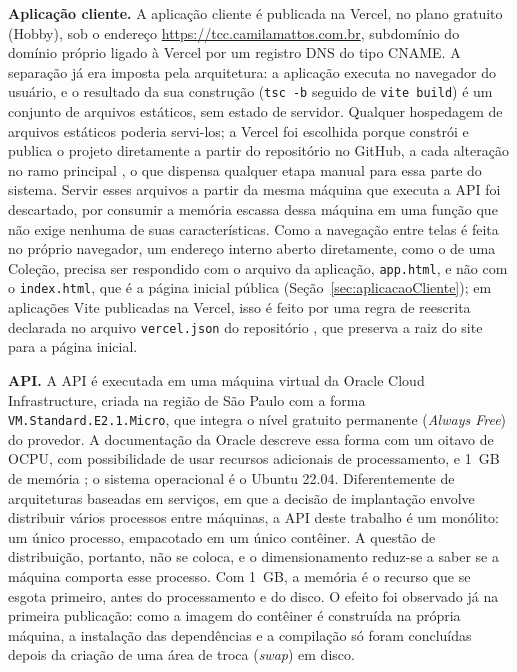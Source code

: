 \textbf{Aplicação cliente.} A aplicação cliente é publicada na Vercel, no plano gratuito (Hobby), sob o endereço \url{https://tcc.camilamattos.com.br}, subdomínio do domínio próprio ligado à Vercel por um registro DNS do tipo CNAME. A separação já era imposta pela arquitetura: a aplicação executa no navegador do usuário, e o resultado da sua construção (\texttt{tsc -b} seguido de \texttt{vite build}) é um conjunto de arquivos estáticos, sem estado de servidor. Qualquer hospedagem de arquivos estáticos poderia servi-los; a Vercel foi escolhida porque constrói e publica o projeto diretamente a partir do repositório no GitHub, a cada alteração no ramo principal \cite{vercel2026git}, o que dispensa qualquer etapa manual para essa parte do sistema. Servir esses arquivos a partir da mesma máquina que executa a API foi descartado, por consumir a memória escassa dessa máquina em uma função que não exige nenhuma de suas características. Como a navegação entre telas é feita no próprio navegador, um endereço interno aberto diretamente, como o de uma Coleção, precisa ser respondido com o arquivo da aplicação, \texttt{app.html}, e não com o \texttt{index.html}, que é a página inicial pública (Seção~\ref{sec:aplicacaoCliente}); em aplicações Vite publicadas na Vercel, isso é feito por uma regra de reescrita declarada no arquivo \texttt{vercel.json} do repositório \cite{vercel2026vite}, que preserva a raiz do site para a página inicial.

\textbf{API.} A API é executada em uma máquina virtual da Oracle Cloud Infrastructure, criada na região de São Paulo com a forma \texttt{VM.Standard.E2.1.Micro}, que integra o nível gratuito permanente (\textit{Always Free}) do provedor. A documentação da Oracle descreve essa forma com um oitavo de OCPU, com possibilidade de usar recursos adicionais de processamento, e 1~GB de memória \cite{oracle2026alwaysfree}; o sistema operacional é o Ubuntu 22.04. Diferentemente de arquiteturas baseadas em serviços, em que a decisão de implantação envolve distribuir vários processos entre máquinas, a API deste trabalho é um monólito: um único processo, empacotado em um único contêiner. A questão de distribuição, portanto, não se coloca, e o dimensionamento reduz-se a saber se a máquina comporta esse processo. Com 1~GB, a memória é o recurso que se esgota primeiro, antes do processamento e do disco. O efeito foi observado já na primeira publicação: como a imagem do contêiner é construída na própria máquina, a instalação das dependências e a compilação só foram concluídas depois da criação de uma área de troca (\textit{swap}) em disco.

